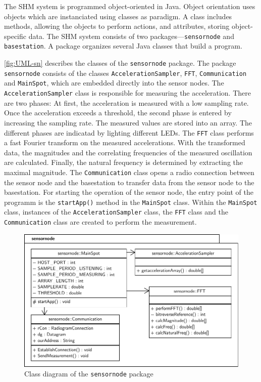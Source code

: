 \documentclass[12pt,a4paper]{scrartcl}
\begin{document}
The SHM system is programmed object-oriented in Java. 
Object orientation uses objects which are instanciated using classes as paradigm. 
A class includes methods, allowing the objects to perform actions, and attributes, storing object-specific data.
The SHM system consists of two packages---\texttt{sensornode} and \texttt{basestation}.
A package organizes several Java classes that build a program.

\autoref{fig:UML-sn} describes the classes of the \texttt{sensor\-node} package.
The package \texttt{sensor\-node} consists of the classes \texttt{Acceleration\-Sampler}, \texttt{FFT}, \texttt{Communi\-cation} and \texttt{Main\-Spot}, which are embedded directly into the sensor nodes.
The \texttt{Acceleration\-Sampler} class is responsible for measuring the acceleration.
There are two phases: At first, the acceleration is measured with a low sampling rate.
Once the acceleration exceeds a threshold, the second phase is entered by increasing the sampling rate. 
The measured values are stored into an array.
The different phases are indicatad by lighting different LEDs.
The \texttt{FFT} class performs a fast Fourier transform on the measured accelerations. 
With the transformed data, the magnitudes and the correlating frequencies of the measured oscillation are calculated.
Finally, the natural frequency is determined by extracting the maximal magnitude.
The \texttt{Communi\-cation} class opens a radio connection between the sensor node and the basestation to transfer data from the sensor node to the basestation.
For starting the operation of the sensor node, the entry point of the programm is the \texttt{start\-App()} method in the \texttt{Main\-Spot} class. 
Within the \texttt{Main\-Spot} class, instances of the \texttt{Acceleration\-Sampler} class, the \texttt{FFT} class and the \texttt{Communication} class are created to perform the measurement.

\begin{figure}[ht]
    \centering
    \includegraphics[width = \textwidth]{figures/uml-sensornode.pdf}
    \caption{Class diagram of the \texttt{sensornode} package}
    \label{fig:UML-sn}
\end{figure}
\end{document}
